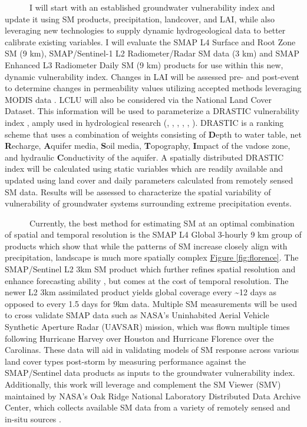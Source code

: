 \documentclass[
]{book}
\begin{document}
~~~~~~I will start with an established groundwater vulnerability index and update it using SM products, precipitation, landcover, and LAI, while also leveraging new technologies to supply dynamic hydrogeological data to better calibrate existing variables. I will evaluate the SMAP L4 Surface and Root Zone SM (9 km), SMAP/Sentinel-1 L2 Radiometer/Radar SM data (3 km) and SMAP Enhanced L3 Radiometer Daily SM (9 km) products for use within this new, dynamic vulnerability index. Changes in LAI will be assessed pre- and post-event to determine changes in permeability values utilizing accepted methods leveraging MODIS data \citep{song2013optical}. LCLU will also be considered via the National Land Cover Dataset. This information will be used to parameterize a DRASTIC vulnerability index \citep{aller1985}, amply used in hydrological research (\citet{hamza2006}, \citet{jang2017}, \citet{panagopoulos2006}, \citet{remesan2008}, \citet{rundquist1991}, \citet{uddameri2007}). DRASTIC is a ranking scheme that uses a combination of weights consisting of \textbf{D}epth to water table, net \textbf{R}echarge, \textbf{A}quifer media, \textbf{S}oil media, \textbf{T}opography, \textbf{I}mpact of the vadose zone, and hydraulic \textbf{C}onductivity of the aquifer. A spatially distributed DRASTIC index will be calculated using static variables which are readily available and updated using land cover and daily parameters calculated from remotely sensed SM data. Results will be assessed to characterize the spatial variability of vulnerability of groundwater systems surrounding extreme precipitation events.

~~~~~~Currently, the best method for estimating SM at an optimal combination of spatial and temporal resolution is the SMAP L4 Global 3-hourly 9 km group of products which show that while the patterns of SM increase closely align with precipitation, landscape is much more spatially complex \protect\hyperlink{fig:florence}{Figure \ref{fig:florence}}. The SMAP/Sentinel L2 3km SM product which further refines spatial resolution and enhance forecasting ability \citep{das2018}, but comes at the cost of temporal resolution. The newer L2 3km assimilated product yields global coverage every \textasciitilde12 days as opposed to every 1.5 days for 9km data. Multiple SM measurements will be used to cross validate SMAP data such as NASA's Uninhabited Aerial Vehicle Synthetic Aperture Radar (UAVSAR) mission, which was flown multiple times following Hurricane Harvey over Houston and Hurricane Florence over the Carolinas. These data will aid in validating models of SM response across various land cover types post-storm by measuring performance against the SMAP/Sentinel data products as inputs to the groundwater vulnerability index. Additionally, this work will leverage and complement the SM Viewer (SMV) maintained by NASA's Oak Ridge National Laboratory Distributed Data Archive Center, which collects available SM data from a variety of remotely sensed and in-situ sources \citep{shrestha2019}.
\end{document}
